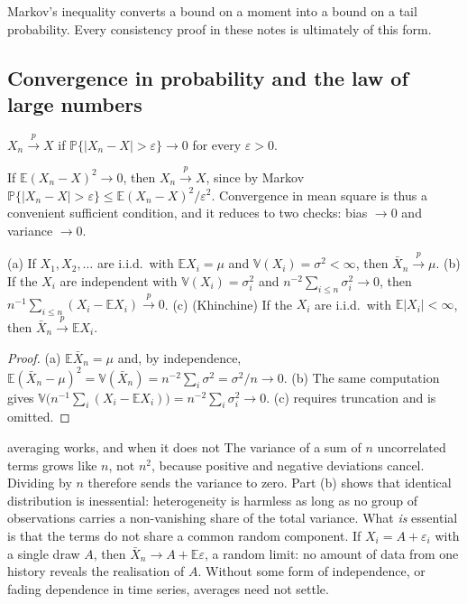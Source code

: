 \documentclass[11pt,a4paper]{article}
\newcommand{\E}{\mathbb{E}}
\newcommand{\V}{\mathbb{V}}
\renewcommand{\P}{\mathbb{P}}
\newcommand{\cp}{\xrightarrow{\;p\;}}
\newcommand{\iid}{i.i.d.}
\newcommand{\Xbar}{\bar X_n}
\begin{document}
Markov's inequality converts a bound on a moment into a bound on a tail probability. Every consistency proof in these notes is ultimately of this form.

\subsection{Convergence in probability and the law of large numbers}

\begin{definition}
$X_n\cp X$ if $\P\{|X_n-X|>\varepsilon\}\to0$ for every $\varepsilon>0$.
\end{definition}

If $\E(X_n-X)^2\to0$, then $X_n\cp X$, since by Markov $\P\{|X_n-X|>\varepsilon\}\le\E(X_n-X)^2/\varepsilon^2$. Convergence in mean square is thus a convenient sufficient condition, and it reduces to two checks: bias $\to0$ and variance $\to0$.

\begin{theorem}\label{thm:lln}
\textup{(a)} If $X_1,X_2,\ldots$ are \iid\ with $\E X_i=\mu$ and $\V(X_i)=\sigma^2<\infty$, then $\Xbar\cp\mu$. \textup{(b)} If the $X_i$ are independent with $\V(X_i)=\sigma_i^2$ and $n^{-2}\sum_{i\le n}\sigma_i^2\to0$, then $n^{-1}\sum_{i\le n}(X_i-\E X_i)\cp0$. \textup{(c)} \textup{(Khinchine)} If the $X_i$ are \iid\ with $\E|X_i|<\infty$, then $\Xbar\cp\E X_i$.
\end{theorem}

\begin{proof}
(a) $\E\Xbar=\mu$ and, by independence, $\E(\Xbar-\mu)^2=\V(\Xbar)=n^{-2}\sum_i\sigma^2=\sigma^2/n\to0$. (b) The same computation gives $\V\big(n^{-1}\sum_i(X_i-\E X_i)\big)=n^{-2}\sum_i\sigma_i^2\to0$. (c) requires truncation and is omitted.
\end{proof}

\begin{whybox}{averaging works, and when it does not}
The variance of a sum of $n$ uncorrelated terms grows like $n$, not $n^2$, because positive and negative deviations cancel. Dividing by $n$ therefore sends the variance to zero. Part (b) shows that identical distribution is inessential: heterogeneity is harmless as long as no group of observations carries a non-vanishing share of the total variance. What \emph{is} essential is that the terms do not share a common random component. If $X_i=A+\varepsilon_i$ with a single draw $A$, then $\Xbar\to A+\E\varepsilon$, a random limit: no amount of data from one history reveals the realisation of $A$. Without some form of independence, or fading dependence in time series, averages need not settle.
\end{whybox}
\end{document}
